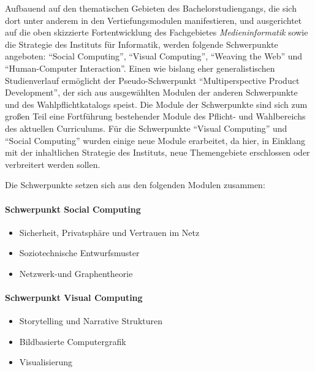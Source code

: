 Aufbauend auf den thematischen Gebieten des Bachelorstudiengangs, die
sich dort unter anderem in den Vertiefungsmodulen manifestieren, und
ausgerichtet auf die oben skizzierte Fortentwicklung des Fachgebietes
\emph{Medieninformatik} sowie die Strategie des Instituts für
Informatik, werden folgende Schwerpunkte angeboten: ``Social
Computing'', ``Visual Computing'', ``Weaving the Web'' und
``Human-Computer Interaction''. Einen wie bislang eher generalistischen
Studienverlauf ermöglicht der Pseudo-Schwerpunkt ``Multiperspective
Product Development'', der sich aus ausgewählten Modulen der anderen
Schwerpunkte und des Wahlpflichtkatalogs speist. Die Module der
Schwerpunkte sind sich zum großen Teil eine Fortführung bestehender
Module des Pflicht- und Wahlbereichs des aktuellen Curriculums. Für die
Schwerpunkte ``Visual Computing'' und ``Social Computing'' wurden einige
neue Module erarbeitet, da hier, in Einklang mit der inhaltlichen
Strategie des Instituts, neue Themengebiete erschlossen oder verbreitert
werden sollen.

Die Schwerpunkte setzen sich aus den folgenden Modulen zusammen:

\paragraph{Schwerpunkt Social
Computing\label{/mi-2017/selbstbericht/0150-soll-zustand-geplante-veraenderungen/0000-geplante-veraenderungen-bachelor}}\label{schwerpunkt-social-computingpathlabelmi-2017selbstbericht0150-soll-zustand-geplante-veraenderungen0000-geplante-veraenderungen-bachelor}

\begin{itemize}
\tightlist
\item
  Sicherheit, Privatsphäre und Vertrauen im Netz
\item
  Soziotechnische Entwurfsmuster
\item
  Netzwerk-und Graphentheorie
\end{itemize}

\paragraph{Schwerpunkt Visual
Computing\label{/mi-2017/selbstbericht/0150-soll-zustand-geplante-veraenderungen/0000-geplante-veraenderungen-bachelor}}\label{schwerpunkt-visual-computingpathlabelmi-2017selbstbericht0150-soll-zustand-geplante-veraenderungen0000-geplante-veraenderungen-bachelor}

\begin{itemize}
\tightlist
\item
  Storytelling und Narrative Strukturen
\item
  Bildbasierte Computergrafik
\item
  Visualisierung
\end{itemize}

